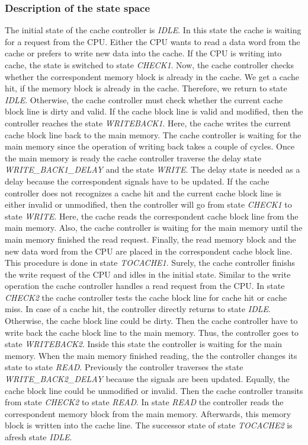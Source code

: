 \subsubsection{Description of the state space}
The initial state of the cache controller is \textit{IDLE}. In this state the cache is waiting for a request from the CPU. Either the CPU wants to read a data word from the cache or prefers to write new data into the cache.
If the CPU is writing into cache, the state is switched to state \textit{CHECK1}. Now, the cache controller checks whether the correspondent memory block is already in the cache. We get a cache hit, if the memory block is already in the cache. Therefore, we return to state \textit{IDLE}. Otherwise, the cache controller must check whether the current cache block line is dirty and valid. If the cache block line is valid and modified, then the controller reaches the state \textit{WRITEBACK1}. Here, the cache writes the current cache block line back to the main memory. The cache controller is waiting for the main memory since the operation of writing back takes a couple of cycles. Once the main memory is ready the cache controller traverse the delay state \textit{WRITE\_BACK1\_DELAY} and the state \textit{WRITE}. The delay state is needed as a delay because the correspondent signals have to be updated. If the cache controller does not recognizes a cache hit and the current cache block line is either invalid or unmodified, then the controller will go from state \textit{CHECK1} to state \textit{WRITE}. Here, the cache reads the correspondent cache block line from the main memory. Also, the cache controller is waiting for the main memory until the main memory finished the read request. Finally, the read memory block and the new data word from the CPU are placed in the correspondent cache block line. This procedure is done in state \textit{TOCACHE1}. Surely, the cache controller finishs the write request of the CPU and idles in the initial state.
Similar to the write operation the cache controller handles a read request from the CPU. In state \textit{CHECK2} the cache controller tests the cache block line for cache hit or cache miss. In case of a cache hit, the controller directly returns to state \textit{IDLE}. Otherwise, the cache block line could be dirty. Then the cache controller have to write back the cache block line to the main memory. Thus, the controller goes to state \textit{WRITEBACK2}. Inside this state the controller is waiting for the main memory. When the main memory finished reading, the the controller changes its state to state \textit{READ}. Previously the controller traverses the state \textit{WRITE\_BACK2\_DELAY} because the signals are been updated. Equally, the cache block line could be unmodified or invalid. Then the cache controller transits from state \textit{CHECK2} to state \textit{READ}. In state \textit{READ} the controller reads the correspondent memory block from the main memory. Afterwards, this memory block is written into the cache line. The successor state of state \textit{TOCACHE2} is afresh state \textit{IDLE}.

